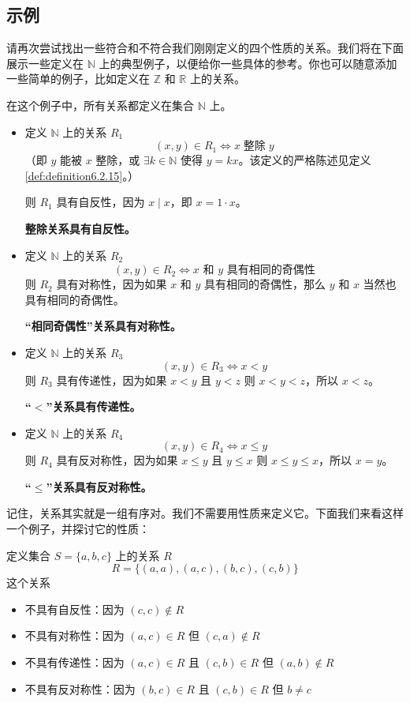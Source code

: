 
\subsection{示例}

请再次尝试找出一些符合和不符合我们刚刚定义的四个性质的关系。我们将在下面展示一些定义在 $\mathbb{N}$ 上的典型例子，以便给你一些具体的参考。你也可以随意添加一些简单的例子，比如定义在 $\mathbb{Z}$ 和 $\mathbb{R}$ 上的关系。\\

\begin{example}
    在这个例子中，所有关系都定义在集合 $\mathbb{N}$ 上。
    \begin{itemize}
        \item 定义 $\mathbb{N}$ 上的关系 $R_1$
        \[(x, y) \in R_1 \iff x \;\text{整除}\; y\]
        （即 $y$ 能被 $x$ 整除，或 $\exists k \in \mathbb{N}$ 使得 $y=kx$。该定义的严格陈述见定义\ref{def:definition6.2.15}。）

        则 $R_1$ 具有自反性，因为 $x \mid x$，即 $x=1 \cdot x$。

        \textbf{整除关系具有自反性。}
        \item 定义 $\mathbb{N}$ 上的关系 $R_2$
        \[(x, y) \in R_2 \iff x \text{ 和 } y \text{ 具有相同的奇偶性}\]
        则 $R_2$ 具有对称性，因为如果 $x$ 和 $y$ 具有相同的奇偶性，那么 $y$ 和 $x$ 当然也具有相同的奇偶性。

        \textbf{``相同奇偶性''关系具有对称性。}
        \item 定义 $\mathbb{N}$ 上的关系 $R_3$
        \[(x, y) \in R_3 \iff x < y\]
        则 $R_3$ 具有传递性，因为如果 $x<y$ 且 $y<z$ 则 $x<y<z$，所以 $x<z$。

        \textbf{``$<$''关系具有传递性。}
        \item 定义 $\mathbb{N}$ 上的关系 $R_4$
        \[(x, y) \in R_4 \iff x \le y\]
        则 $R_4$ 具有反对称性，因为如果 $x \le y$ 且 $y \le x$ 则 $x \le y \le x$，所以 $x=y$。

        \textbf{``$\le$''关系具有反对称性。}
    \end{itemize}
\end{example}

\begin{example}
    记住，关系其实就是一组有序对。我们不需要用性质来定义它。下面我们来看这样一个例子，并探讨它的性质：

    定义集合 $S=\{a,b,c\}$ 上的关系 $R$
    \[R = \{(a, a),(a, c),(b, c),(c, b)\}\]
    这个关系
    \begin{itemize}
        \item 不具有自反性：因为 $(c,c) \notin R$
        \item 不具有对称性：因为 $(a, c) \in R$ 但 $(c, a) \notin R$
        \item 不具有传递性：因为 $(a, c) \in R$ 且 $(c, b) \in R$ 但 $(a, b) \notin R$
        \item 不具有反对称性：因为 $(b, c) \in R$ 且 $(c, b) \in R$ 但 $b \ne c$
    \end{itemize}
\end{example}

